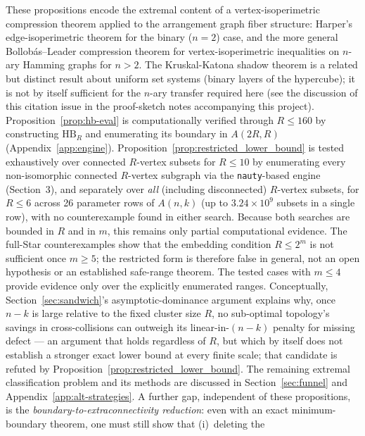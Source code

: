 \begin{remark}
These propositions encode the extremal content of a vertex-isoperimetric
compression theorem applied to the arrangement graph fiber structure: Harper's
edge-isoperimetric theorem \cite{harper1966optimal} for the binary ($n=2$)
case, and the more general Bollob\'{a}s--Leader compression theorem for
vertex-isoperimetric inequalities on $n$-ary Hamming graphs
\cite{bollobas1991vertex} for $n > 2$. The Kruskal-Katona shadow theorem
\cite{kruskal1963number,katona1968theorem} is a related but distinct result
about uniform set systems (binary layers of the hypercube); it is not by
itself sufficient for the $n$-ary transfer required here (see the discussion
of this citation issue in the proof-sketch notes accompanying this project).
Proposition~\ref{prop:hb-eval} is
computationally verified through $R \le 160$ by constructing $\mathrm{HB}_R$ and
enumerating its boundary in $A(2R, R)$ (Appendix~\ref{app:engine}).
Proposition~\ref{prop:restricted_lower_bound} is tested exhaustively over connected
$R$-vertex subsets for $R \le 10$ by enumerating every non-isomorphic connected
$R$-vertex subgraph via the \texttt{nauty}-based engine (Section~3), and
separately over \emph{all} (including disconnected) $R$-vertex subsets, for
$R \le 6$ across 26 parameter rows of $A(n,k)$ (up to $3.24\times10^9$ subsets
in a single row), with no counterexample found in either search. Because
both searches are bounded in $R$ and in $m$, this remains only partial computational
evidence. The full-Star counterexamples show that the embedding condition
$R \le 2^m$ is not sufficient once $m \ge 5$; the restricted form is therefore
false in general, not an open hypothesis or an established safe-range theorem. The tested cases
with $m \le 4$ provide evidence only over the explicitly enumerated ranges.
Conceptually,
Section~\ref{sec:sandwich}'s asymptotic-dominance argument explains why, once
$n-k$ is large relative to the fixed cluster size $R$, no sub-optimal topology's
savings in cross-collisions can outweigh its linear-in-$(n-k)$ penalty for
missing defect --- an argument that holds regardless of $R$, but which by itself
does not establish a stronger exact lower bound at every finite scale; that
candidate is refuted by Proposition~\ref{prop:restricted_lower_bound}. The
remaining extremal classification problem and its methods are discussed in
Section~\ref{sec:funnel} and
Appendix~\ref{app:alt-strategies}. A further gap, independent of these
propositions, is the \emph{boundary-to-extraconnectivity reduction}: even with
an exact minimum-boundary theorem, one must still show that (i)~deleting the

\end{remark}
